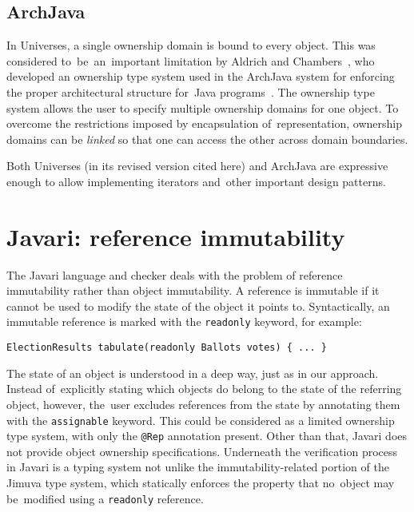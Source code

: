 \documentclass{pracamgr}
\theoremstyle{break}
\theoremstyle{break}
\theoremstyle{break}
\begin{document}
\subsection{ArchJava}

In Universes, a single ownership domain is bound to every object. This
was considered to~be~an~important limitation by Aldrich and
Chambers~\cite{domains}, who developed an ownership type system used
in the ArchJava system for enforcing the proper architectural
structure for~Java programs~\cite{archjava}. The ownership type system
allows the user to specify multiple ownership domains for one
object. To overcome the restrictions imposed by encapsulation
of~representation, ownership domains can be \emph{linked} so that one
can access the other across domain boundaries.

Both Universes (in its revised version cited here) and ArchJava are
expressive enough to allow implementing iterators and~other important
design patterns.

\section{Javari: reference immutability}

The Javari language and checker \cite{javari} deals with the problem
of reference immutability rather than object immutability. A reference
is immutable if it cannot be used to modify the state of the object it
points to. Syntactically, an immutable reference is marked with the
\texttt{readonly} keyword, for example:

\begin{center}
  \texttt{ElectionResults tabulate(readonly Ballots votes) \{ ... \}}
\end{center}

The state of an object is understood in a deep way, just as in our
approach. Instead of~explicitly stating which objects do belong to the
state of the referring object, however, the~user excludes references
from the state by annotating them with the \texttt{assignable}
keyword. This could be considered as a limited ownership type system,
with only the \texttt{@Rep} annotation present. Other than that,
Javari does not provide object ownership specifications. Underneath
the verification process in Javari is a typing system not unlike the
immutability-related portion of the Jimuva type system, which
statically enforces the property that no~object may be~modified using
a \texttt{readonly} reference.
\end{document}
